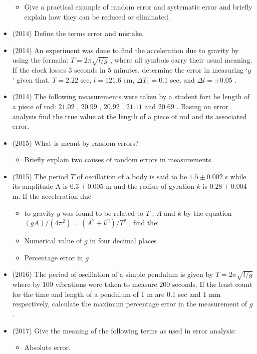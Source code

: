 \documentclass{article}
\begin{document}
\begin{itemize}
\begin{itemize}
\item Give a practical example of random error and systematic error and briefly explain how they can be reduced or eliminated.
\end{itemize}
\item (2014)  Define the terms error and mistake.
\item (2014)  An experiment was done to find the acceleration due to gravity by using the formula: $ T=2\pi\sqrt{l/g}$ , where all symbols carry their usual meaning.  If the clock losses $ 3$ seconds in $ 5$ minutes, determine the error in measuring ‘$ g$ ’ given that, $ T=2.22$ sec, $ l=121.6$ cm, $ \Delta T_{1}=0.1$ sec, and  $ \Delta l=\pm 0.05$ .
\item (2014)  The following measurements were taken by a student fort he length of a piece of rod: $ 21.02$ , $ 20.99$ , $ 20.92$ , $ 21.11$ and $ 20.69$ . Basing on error analysis find the true value at the length of a piece of rod and its associated error.
\item (2015)  What is meant by random errors?\begin{itemize}
\item Briefly explain two causes of random errors in measurements. 
\end{itemize}
\item (2015)  The period $ T$ of oscillation of a body is said to be $ 1.5\pm 0.002$ s while its amplitude A is $ 0.3\pm 0.005$ m and the radius of gyration $ k$ is $ 0.28+0.004$ m. If the acceleration due\begin{itemize}
\item to gravity $ g$ was found to be related to $ T$ , $ A$ and $ k$ by the equation $ (gA)/(4\pi^{2})=( A^{2}+k^{2})/T^{2}$ , find the:
\item Numerical value of $ g$ in four decimal places
\item Percentage error in $ g$ .
\end{itemize}
\item (2016)  The period of oscillation of a simple pendulum is given by $ T=2\pi\sqrt{l/g}$ where by $ 100$ vibrations were taken to measure $ 200$ seconds. If the least count for the time and length of a pendulum of $ 1$ m are $ 0.1$ sec and $ 1$ mm respectively, calculate the maximum percentage error in the measurement of $ g$ .
\item (2017)  Give the meaning of the following terms as used in error analysis:\begin{itemize}
\item Absolute error. 

\end{itemize}
\end{itemize}
\end{document}
